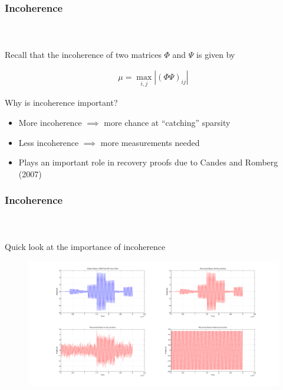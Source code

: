 
\begin{frame}[t]
\frametitle{Incoherence}
\framesubtitle{~~}  %

Recall that the incoherence of two matrices $\Phi$ and $\Psi$ is given by 

\begin{align}
	\mu = \max_{i,j} |(\Phi \Psi)_{ij}|
	\label{incoherence}
\end{align}

Why is incoherence important?

\begin{itemize}
	\item More incoherence $\implies$ more chance at ``catching'' sparsity
	\item Less incoherence $\implies$ more measurements needed
	\item Plays an important role in recovery proofs due to Candes and Romberg (2007)
\end{itemize}
\end{frame}

\begin{frame}[t]
\frametitle{Incoherence}
\framesubtitle{~~}  %
Quick look at the importance of incoherence

\begin{figure}[h!]
  \centering
    \includegraphics[width=1\textwidth]{figs/incoherence.pdf}
\end{figure}


\end{frame}

